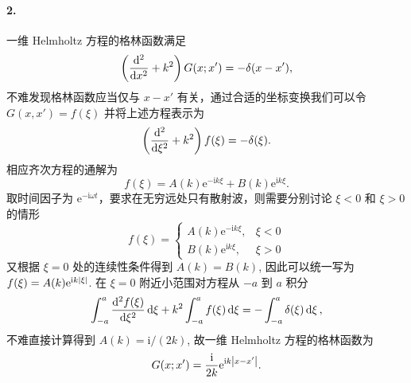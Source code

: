 \documentclass[12pt]{article}
\begin{document}
\paragraph{2.}
一维 Helmholtz 方程的格林函数满足
\begin{equation*}
	\left(\dv[2]{x} + k^2\right) G(x; x') = -\delta(x - x'),
\end{equation*}
不难发现格林函数应当仅与 $x - x'$ 有关，通过合适的坐标变换我们可以令 $G(x, x') = f(\xi)$ 并将上述方程表示为
\begin{equation*}
	\left(\dv[2]{\xi} + k^2\right) f(\xi) = - \delta(\xi).
\end{equation*}
相应齐次方程的通解为
\begin{equation*}
	f(\xi) = A(k) \mathrm{e}^{-\mathrm{i} k\xi} + B(k) \mathrm{e}^{\mathrm{i} k\xi}.
\end{equation*}
取时间因子为 $\mathrm{e}^{-\mathrm{i} \omega t}$，要求在无穷远处只有散射波，则需要分别讨论 $\xi < 0$ 和 $\xi > 0$ 的情形
\begin{equation*}
	f(\xi) = \begin{cases}
		A(k) \mathrm{e}^{-\mathrm{i} k\xi}, &\xi < 0 \\
		B(k) \mathrm{e}^{\mathrm{i} k\xi}, &\xi > 0
	\end{cases}
\end{equation*}
又根据 $\xi = 0$ 处的连续性条件得到 $A(k) = B(k)$, 因此可以统一写为 $f(\xi) = A(k) \mathrm{e}^{\mathrm{i} k\abs{\xi}}$.
在 $\xi = 0$ 附近小范围对方程从 $-a$ 到 $a$ 积分
\begin{equation*}
	\int_{-a}^{a} \dv[2]{f(\xi)}{\xi} \dd{\xi} + k^2 \int_{-a}^{a} f(\xi) \dd{\xi} = -\int_{-a}^{a} \delta(\xi) \dd{\xi},
\end{equation*}
不难直接计算得到 $A(k) = \mathrm{i}/(2k)$, 故一维 Helmholtz 方程的格林函数为
\begin{equation*}
	G(x; x') = \frac{\mathrm{i}}{2k} \mathrm{e}^{\mathrm{i} k\abs{x - x'}}.
\end{equation*}
\end{document}
